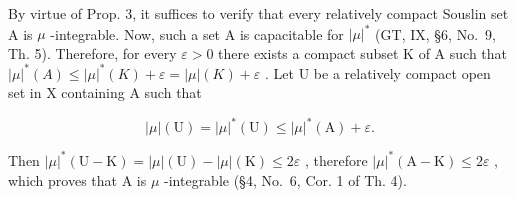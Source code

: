 By virtue of Prop. 3, it suffices to verify that every relatively compact Souslin set A is \(\mu\) -integrable. Now, such a set A is capacitable for \(|\mu|^*\) (GT, IX, §6, No.~9, Th. 5). Therefore, for every \(\varepsilon > 0\) there exists a compact subset K of A such that \(|\mu|^*(A) \leqslant |\mu|^*(K) + \varepsilon = |\mu|(K) + \varepsilon\) . Let U be a relatively compact open set in X containing A such that

\[
| \mu | (\mathrm{U}) = | \mu | ^ {*} (\mathrm{U}) \leqslant | \mu | ^ {*} (\mathrm{A}) + \varepsilon .
\]

Then \(|\mu|^*(\mathrm{U} - \mathrm{K}) = |\mu|(\mathrm{U}) - |\mu|(\mathrm{K}) \leqslant 2\varepsilon\) , therefore \(|\mu|^*(\mathrm{A} - \mathrm{K}) \leqslant 2\varepsilon\) , which proves that A is \(\mu\) -integrable (§4, No.~6, Cor. 1 of Th. 4).

